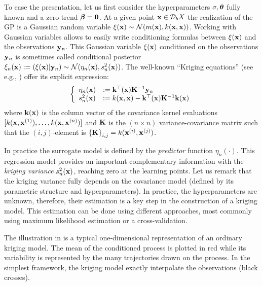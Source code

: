 To ease the presentation, let us first consider the hyperparameters $\sigma, {\boldsymbol{\theta}}$ fully known and a zero trend ${\boldsymbol{\beta}} = \textbf{0}$. 
At a given point ${\bf x} \in \mathcal{D}_bX$ the realization of the GP is a Gaussian random variable $\xi({\bf x}) \sim \mathcal{N}(m({\bf x}), k({\bf x}, {\bf x}))$. 
Working with Gaussian variables allows to easily write conditioning formulas between $\xi({\bf x})$ and the observations ${\bf y}_n$. 
This Gaussian variable $\xi({\bf x})$ conditioned on the observations ${\bf y}_n$ is sometimes called conditional posterior $\xi_n({\bf x}) := (\xi({\bf x}) | {\bf y}_n) \sim \mathcal{N}(\eta_n({\bf x}), s_n^2({\bf x}))$. 
The well-known ``Kriging equations'' (see e.g., \cite{rasmussen_2006}) offer its explicit expression:
\begin{equation}
    \left\{
    \begin{array}{ll}
        \eta_n({\bf x}) &:= {\bf k}^\top({\bf x}) {\bf K}^{-1} {\bf y}_n\\
        s_n^2({\bf x}) &:= k({\bf x}, {\bf x}) - {\bf k}^\top({\bf x}) {\bf K}^{-1} {\bf k}({\bf x})
    \end{array}
\right.
\label{eq:kriging}
\end{equation}
where ${\bf k}({\bf x})$ is the column vector of the covariance kernel evaluations $[k({\bf x}, {\bf x}^{(1)}), \dots,\allowbreak k({\bf x}, {\bf x}^{(n)})]$ and ${\bf K}$ is the $(n \times n)$ 
variance-covariance matrix such that the $(i, j)$-element is $\left\{{\bf K} \right\}_{i, j}=k({\bf x}^{(i)}, {\bf x}^{(j)})$.

In practice the surrogate model is defined by the \textit{predictor} function $\eta_n(\cdot)$. 
This regression model provides an important complementary information with the \textit{kriging variance} $s_n^2({\bf x})$, reaching zero at the learning points. 
Let us remark that the kriging variance fully depends on the covariance model (defined by its parametric structure and hyperparameters). 
In practice, the hyperparameters are unknown, therefore, their estimation is a key step in the construction of a kriging model. 
This estimation can be done using different approaches, most commonly using maximum likelihood estimation or a cross-validation.

The illustration in  is a typical one-dimensional representation of an ordinary kriging model. 
The mean of the conditioned process is plotted in red while its variability is represented by the many trajectories drawn on the process. 
In the simplest framework, the kriging model exactly interpolate the observations (black crosses). 

